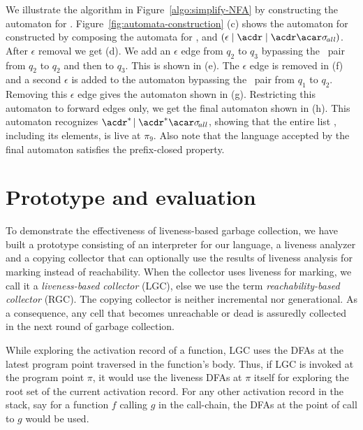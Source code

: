 \documentclass{llncs}
\begin{document}


We illustrate the algorithm in Figure~\ref{algo:simplify-NFA} by
constructing the automaton for .
Figure~\ref{fig:automata-construction} (c) shows the automaton for
 constructed by composing the automata for
,  and $(\epsilon \mid \acdr
\mid \acdr\acar\sigma_{\mathit{\!all}})$.  After $\epsilon$ removal we
get (d). We add an $\epsilon$ edge from $q_2$ to $q_3$ bypassing the
\bcdr\acdr\ pair from $q_2$ to $q_2$ and then to $q_3$. This is shown
in (e).  The $\epsilon$ edge is removed in (f) and a second $\epsilon$
is added to the automaton bypassing the \bcar\acar\ pair from $q_1$ to
$q_2$.  Removing this $\epsilon$ edge gives the automaton shown in
(g).  Restricting this automaton to forward edges only, we get the
final automaton shown in (h). This automaton recognizes $\acdr^{*}\!\mid\acdr^{*}\acar \sigma_{\mathit \!all}$, showing that the entire
list \py, including its elements, is live at $\pi_9$. Also note that
the language accepted by the final automaton satisfies the
prefix-closed property.


\section{Prototype and evaluation}\label{sec:experiments}
To demonstrate the effectiveness of liveness-based garbage collection,
we  have  built a  prototype  consisting  of  an interpreter  for  our
language,  a  liveness  analyzer  and  a copying  collector  that  can
optionally use the results of liveness analysis for marking instead of
reachability. When the collector uses liveness for marking, we call it
a  {\em liveness-based  collector} (LGC),  else we  use the  term {\em
  reachability-based  collector}  (RGC).   The  copying  collector  is
neither incremental nor generational.  As a consequence, any cell that
becomes unreachable or  dead is assuredly collected in  the next round
of garbage collection.

While exploring the activation record of a function, LGC uses the DFAs
at  the latest  program  point traversed  in the function's body.  Thus, if  LGC
is invoked  at the program point   $\pi$,  it would  use  the
liveness  DFAs at  $\pi$ itself for exploring the root set of the
current activation record. For any other activation record in the
stack, say for a function ${\mathit f}$ calling ${\mathit g}$ in the call-chain,
the DFAs at the point of call to  ${\mathit g}$ would be used.
\end{document}
